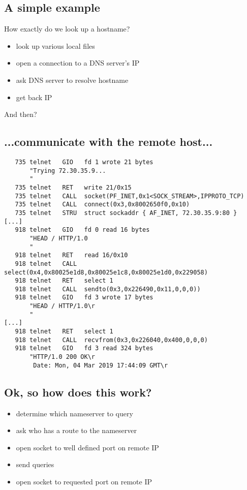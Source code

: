 \documentclass[xga]{xdvislides}
\newcommand{\smallish}{\fontsize{16}{16}\selectfont}
\begin{document}
\subsection{A simple example}
How exactly do we look up a hostname?
\\
\begin{itemize}
	\item look up various local files
	\item open a connection to a DNS server's IP
	\item ask DNS server to resolve hostname
	\item get back IP
\end{itemize}
\vspace{.5in}

And then?

\subsection{...communicate with the remote host...}
\smallish
\begin{verbatim}
   735 telnet   GIO   fd 1 wrote 21 bytes
       "Trying 72.30.35.9...
       "
   735 telnet   RET   write 21/0x15
   735 telnet   CALL  socket(PF_INET,0x1<SOCK_STREAM>,IPPROTO_TCP)
   735 telnet   CALL  connect(0x3,0x8002650f0,0x10)
   735 telnet   STRU  struct sockaddr { AF_INET, 72.30.35.9:80 }
[...]
   918 telnet   GIO   fd 0 read 16 bytes
       "HEAD / HTTP/1.0
       "
   918 telnet   RET   read 16/0x10
   918 telnet   CALL  select(0x4,0x80025e1d8,0x80025e1c8,0x80025e1d0,0x229058)
   918 telnet   RET   select 1
   918 telnet   CALL  sendto(0x3,0x226490,0x11,0,0,0))
   918 telnet   GIO   fd 3 wrote 17 bytes
       "HEAD / HTTP/1.0\r
       "
[...]
   918 telnet   RET   select 1
   918 telnet   CALL  recvfrom(0x3,0x226040,0x400,0,0,0)
   918 telnet   GIO   fd 3 read 324 bytes
       "HTTP/1.0 200 OK\r
        Date: Mon, 04 Mar 2019 17:44:09 GMT\r
\end{verbatim}
\Normalsize

\subsection{Ok, so how does this work?}
\begin{itemize}
	\item determine which nameserver to query
	\item ask who has a route to the nameserver
	\item open socket to well defined port on remote IP
	\item send queries
	\item open socket to requested port on remote IP
\end{itemize}
\end{document}
